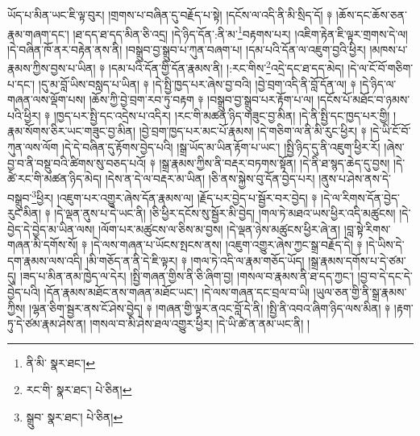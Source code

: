 ཡོད་པ་མིན་ཡང་ཇི་ལྟ་བུར། །གྲགས་པ་བཞིན་དུ་བརྗོད་པ་སྟེ། །དངོས་ལ་འདི་ནི་མི་སྲིད་དོ། ༈ །ཆོས་དང་ཆོས་ཅན་རྣམ་གཞག་དང་། །ཐ་དད་ཐ་དད་མིན་ཅི་འདྲ། །དེ་ཉིད་དོན་:ནི་མ་\footnote{ནི་མི་  སྣར་ཐང་། }བརྟགས་པར། །འཇིག་རྟེན་ཇི་ལྟར་གྲགས་དེ་ལ། །དེ་བཞིན་ཁོ་ནར་བརྟེན་ནས་ནི། །བསྒྲུབ་བྱ་སྒྲུབ་པ་ཀུན་བཞག་པ། །དམ་པའི་དོན་ལ་འཇུག་བྱའི་ཕྱིར། །མཁས་པ་རྣམས་ཀྱིས་བྱས་པ་ཡིན། ༈ །དམ་པའི་དོན་གྱི་དོན་རྣམས་ནི། །:རང་གིས་\footnote{རང་གི་  སྣར་ཐང་།  པེ་ཅིན། }འདྲེ་དང་ཐ་དད་མེད། །དེ་ལ་ངོ་བོ་གཅིག་པ་དང་། །དུ་མ་བློ་ཡིས་བསླད་པ་ཡིན། ༈ །དེ་སྤྱི་ཁྱད་པར་ཞེས་བྱ་བའི། །བྱེ་བྲག་འདི་ནི་བློ་དོན་ལ། ༈ །དེ་ཉིད་ལ་གཞན་ལས་ལྡོག་པས། །ཆོས་ཀྱི་བྱེ་བྲག་རབ་ཏུ་བརྟག ༈ །བསྒྲུབ་བྱ་སྒྲུབ་པར་རྟོག་པ་ལ། །དངོས་པོ་མཐོང་བ་ཉམས་པའི་ཕྱིར། ༈ །ཁྱད་པར་སྤྱི་དང་འདྲེས་པ་འདིར། །རང་གི་མཚན་ཉིད་གཟུང་བྱ་མིན། །དེ་ནི་སྤྱི་དང་ཁྱད་པར་གྱི། །རྣམ་སོགས་ཅིར་ཡང་གཟུང་བྱ་མིན། །བྱེ་བྲག་ཁྱད་པར་མང་པོ་རྣམས། །དེ་གཅིག་ལ་ནི་མི་རུང་ཕྱིར། ༈ །དེ་ཡི་ངོ་བོ་ཀུན་ལས་ལོག །དེ་དེ་བཞིན་དུ་རྟོགས་བྱེད་པའི། །སྒྲ་ཡོད་མ་ཡིན་རྟོག་པ་ཡང་། །སྤྱི་ཉིད་དུ་ནི་འཇུག་ཕྱིར་རོ། །ཞེས་བྱ་བ་ནི་བསྡུ་བའི་ཚིགས་སུ་བཅད་པའོ། ༈ །སྒྲ་རྣམས་ཀྱིས་ནི་བརྡར་བཏགས་སྟོན། །དེ་ནི་ཐ་སྙད་ཆེད་དུ་བྱས། །དེ་ཚེ་རང་གི་མཚན་ཉིད་མེད། །དེས་ན་དེ་ལ་བརྡར་མ་ཡིན། །ཅི་ནས་སྐྱེས་བུ་དོན་བྱེད་པར། །ནུས་པ་ཤེས་ནས་དེ་བསྒྲུབ་\footnote{སྒྲུབ་  སྣར་ཐང་།  པེ་ཅིན། }ཕྱིར། །འཇུག་པར་འགྱུར་ཞེས་དོན་རྣམས་ལ། །རྗོད་པར་བྱེད་པ་སྦྱོར་བར་བྱེད། ༈ །དེ་ལ་རིགས་དོན་བྱེད་རུང་མིན། ༈ །དེ་ལྡན་ནུས་པ་དེ་ཡང་ནི། །ཅི་ཕྱིར་དངོས་སུ་སྦྱོར་མི་བྱེད། །གལ་ཏེ་མཐའ་ཡས་ཕྱིར་འདི་མཚུངས། །དེ་བྱེད་དེ་བྱེད་མ་ཡིན་ལས། །ལོག་པར་མཚུངས་ལ་ཅིས་མ་བྱས། །དེ་ལྡན་ཉེས་མཚུངས་ཕྱིར་ཞེ་ན། །བླ་སྟེ་རིགས་གཞན་མི་དགོས་སོ། ༈ །དེ་ལས་གཞན་པ་ཡོངས་སྤངས་ནས། །འཇུག་འགྱུར་ཞེས་ཀྱང་སྒྲ་བརྗོད་དེ། ༈ །དེ་ཡིས་དེ་དག་རྣམས་ལས་འདི། །མི་གཅོད་ན་ནི་དེ་ཇི་ལྟར། ༈ །གལ་ཏེ་འདི་ལ་རྣམ་གཅོད་ཡོད། །སྒྲ་རྣམས་དགོས་པ་དེ་ཙམ་དུ། །ཟད་པ་མིན་ནམ་ཁྱེད་ལ་དེར། །སྤྱི་གཞན་གྱིས་ནི་ཅི་ཞིག་བྱ། །གསལ་བ་རྣམས་ནི་ཐ་དད་ཀྱང་། །བྱ་བ་དེ་དང་དེ་བྱེད་པའི། །དོན་རྣམས་མཐོང་ནས་གཞན་མཐོང་ཡང་། །དེ་ལས་གཞན་དང་བྲལ་བ་ཡི། །ཡུལ་ཅན་གྱི་ནི་སྒྲ་རྣམས་ཀྱིས། །ལྷན་ཅིག་སྦྱར་ནས་ངོ་ཤེས་བྱེད། ༈ །གཞན་གྱི་ལྟར་ནའང་བློ་དེ་ནི། །སྤྱི་ནི་འབའ་ཞིག་ཉིད་ལས་མིན། ༈ །རྟག་ཏུ་དེ་ཙམ་རྣམ་ཤེས་ན། །གསལ་བ་མི་ཤེས་ཐལ་འགྱུར་ཕྱིར། །དེ་ཡི་ཚེ་ན་ནམ་ཡང་ནི། །
